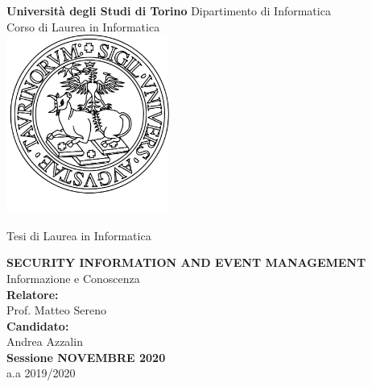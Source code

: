 \documentclass[corpo=11pt,numerazioneromana]{toptesi}
\begin{document}


\begin{titlepage}
    \begin{center}
        \huge
        \textbf{Università degli Studi di Torino}
        \Large
        Dipartimento di Informatica\\
        \Large
        \vspace{0.5cm}
        Corso di Laurea in Informatica\\
        
        \vspace{1cm}
        \includegraphics[width=0.4\textwidth]{images/logo.jpg}
        
        \Large
        \vspace{0.5cm}
        Tesi di Laurea in Informatica
         
        \vspace{1cm}
        \textbf{SECURITY INFORMATION AND EVENT MANAGEMENT\\}
        \vspace{0.5cm}
        Informazione e Conoscenza\\
        
        \vspace{1cm}
        \textbf{Relatore:\\}
        Prof. Matteo Sereno\\
        
        
        \vspace{0.5cm}
        \textbf{Candidato:\\}
        Andrea Azzalin\\
        
        \large
        \vspace{1.30cm}
        \textbf{Sessione NOVEMBRE 2020\\}
        a.a 2019/2020\\
      


    \end{center}
\end{titlepage}
\end{document}
